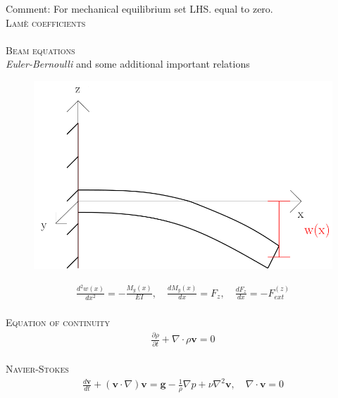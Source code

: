 \documentclass[11pt,a4paper,english]{article}
\begin{document}
Comment: For mechanical equilibrium set LHS. equal to zero. 
\\[2ex]

{\scshape Lamè coefficients} \\
\\[2ex]

{\scshape Beam equations} \\

\emph{Euler-Bernoulli} and some additional important relations

\begin{figure}[h!]
\centering
\includegraphics[scale=0.15]{figures/beam.png}
\end{figure}


\begin{align*}
\frac{d^2 w(x)}{dx^2} = - \frac{M_y (x)}{EI}, \quad \frac{dM_y(x)}{dx} = F_z, \quad \frac{dF_z}{dx} = - F_{ext}^{(z)} 
\end{align*}
\\[2ex]

{\scshape Equation of continuity} \\
\begin{align*}
\frac{\partial \rho}{\partial t} + \nabla \cdot  \rho \mathbf{v} = 0
\end{align*}
\\[2ex]

{\scshape Navier-Stokes} \\
\begin{align*}
\frac{d \mathbf{v}}{dt} + (\mathbf{v} \cdot \nabla)\mathbf{v} = \mathbf{g} - \frac{1}{\rho} \nabla p + \nu \nabla^2 \mathbf{v}, \quad \nabla \cdot \mathbf{v} = 0  
\end{align*}
\\[2ex]
\end{document}

